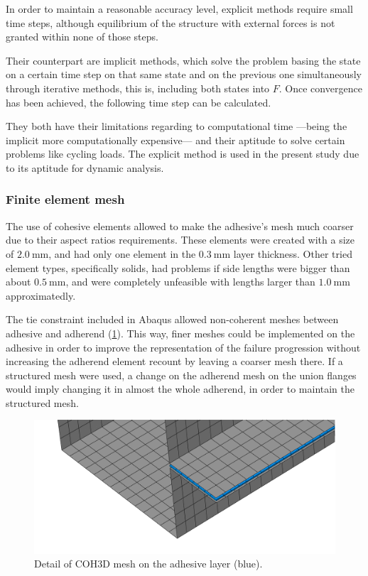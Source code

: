 \documentclass[cmfonts]{witpress}
\begin{document}
In order to maintain a reasonable accuracy level, explicit methods require small time steps, although equilibrium of the structure with external forces is not granted within none of those steps.

Their counterpart are implicit methods, which solve the problem basing the state on a certain time step on that same state and on the previous one simultaneously through iterative methods, this is, including both states into $F$. Once convergence has been achieved, the following time step can be calculated.

They both have their limitations regarding to computational time ---being the implicit more computationally expensive--- and their aptitude to solve certain problems like cycling loads. The explicit method is used in the present study due to its aptitude for dynamic analysis.

\subsubsection{Finite element mesh}

The use of cohesive elements allowed to make the adhesive's mesh much coarser due to their aspect ratios requirements. These elements were created with a size of $\SI{2.0}{\mm}$, and had only one element in the $\SI{0.3}{\mm}$ layer thickness. Other tried element types, specifically solids, had problems if side lengths were bigger than about $\SI{0.5}{\mm}$, and were completely unfeasible with lengths larger than $\SI{1.0}{\mm}$ approximatedly.

The tie constraint included in Abaqus allowed non-coherent meshes between adhesive and adherend (\cref{fig:mesh_detail_coh3d_comparison}). This way, finer meshes could be implemented on the adhesive in order to improve the representation of the failure progression without increasing the adherend element recount by leaving a coarser mesh there. If a structured mesh were used, a change on the adherend mesh on the union flanges would imply changing it in almost the whole adherend, in order to maintain the structured mesh.

\begin{figure}
	\centering
	\includegraphics[width=0.7\linewidth]{figures/IMG_CUTRES/mesh_detail_coh3d_comparison}
	\caption[Detail of COH3D mesh on the adhesive layer.]{Detail of COH3D mesh on the adhesive layer (blue).}
	\label{fig:mesh_detail_coh3d_comparison}
\end{figure}
\end{document}
